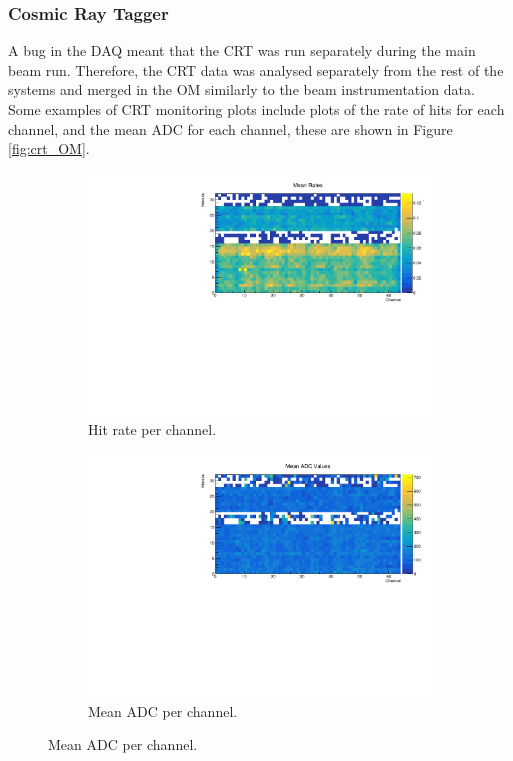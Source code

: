\subsubsection*{Cosmic Ray Tagger}
A bug in the DAQ meant that the CRT was run separately during the main beam 
run. Therefore, the CRT data was analysed separately from the rest of the 
\protodune{} systems and merged in the OM similarly to the beam instrumentation 
data. Some examples of CRT monitoring plots include plots of the rate of hits
for each channel, and the mean ADC for each channel, these are shown in Figure
\ref{fig:crt_OM}.

\begin{figure}

	\centering

	\begin{subfigure}[b]{0.8\textwidth}
		\centering
		\vspace{3mm}
		\includegraphics[width=\textwidth]{figures/crt_rate_om.pdf}
		\caption {Hit rate per channel.}
		\label{fig:crt_rate_om}
	\end{subfigure}

	\begin{subfigure}[b]{0.8\textwidth}
		\centering
		\vspace{3mm}
		\includegraphics[width=\textwidth]{figures/crt_adc_om.pdf}
		\caption {Mean ADC per channel.}
		\label{fig:crt_adc_om}
	\end{subfigure}


\end{figure}
